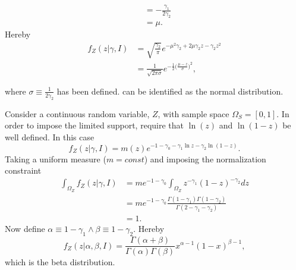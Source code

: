 \begin{example}
\begin{equation}
\begin{split}
			&= -\frac{\gamma_1}{2\gamma_2}\\
			&=\mu.
		\end{split}
	\end{equation}
	Hereby
	\begin{equation}
		\begin{split}
			f_Z(z|\gamma,I) &= \sqrt{\frac{\gamma_2}{\pi}}e^{-\mu^2\gamma_2+2\mu \gamma_2z-\gamma_2z^2}\\
			&= \frac{1}{\sqrt{2\pi\sigma}}e^{-\frac{1}{2}\big(\frac{\mu-z}{\sigma}\big)^2},\\\\
		\end{split}
		\label{eq:norm1}
	\end{equation}
	where $\sigma\equiv \frac{1}{2\gamma_2}$ has been defined.  can be identified as the normal distribution.
\end{example}

\begin{example}
	Consider a continuous random variable, $Z$, with sample space $\Omega_S =[0,1]$. In order to impose the limited support, require that $\ln(z)$ and $\ln(1-z)$ be well defined. In this case
	\begin{equation}
		f_Z(z|\gamma,I)=m(z)e^{-1-\gamma_0-\gamma_1\ln z-\gamma_2\ln(1-z)}.
	\end{equation}
	Taking a uniform measure ($m= const$) and imposing the normalization constraint
	\begin{equation}
		\begin{split}
			\int_{\Omega_Z} f_Z(z|\gamma,I) &= me^{-1-\gamma_0}\int_{\Omega_Z} z^{-\gamma_1}(1-z)^{-\gamma_2}dz\\
			&= me^{-1-\gamma_0}\frac{\Gamma(1-\gamma_1)\Gamma(1-\gamma_2)}{\Gamma(2-\gamma_1-\gamma_2)}\\
			&=1.
		\end{split}
	\end{equation}
	Now define $\alpha \equiv 1-\gamma_1\wedge \beta \equiv 1-\gamma_2$. Hereby
	\begin{equation}
		f_Z(z|\alpha,\beta,I) = \frac{\Gamma(\alpha+\beta)}{\Gamma(\alpha)\Gamma(\beta)}x^{\alpha-1}(1-x)^{\beta-1},
	\end{equation}
	which is the beta distribution. 
\end{example}


